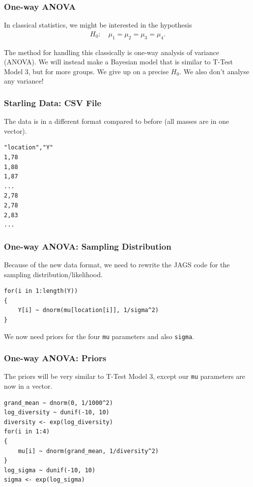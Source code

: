 \documentclass{beamer}
\begin{document}
\begin{frame}[fragile]
\frametitle{One-way ANOVA}
In classical statistics, we might be interested in the hypothesis
\begin{align}
H_0:\quad \mu_1 = \mu_2 = \mu_3 = \mu_4.
\end{align}
\pause

The method for handling this classically is one-way analysis of variance
(ANOVA). We will instead make a Bayesian model that is similar to T-Test
Model 3, but for more groups. We give up on a precise $H_0$.
We also don't analyse any variance!

\end{frame}



\begin{frame}[fragile]
\frametitle{Starling Data: CSV File}
The data is in a different format compared to before (all masses are in one
vector).
\begin{verbatim}
"location","Y"
1,78
1,88
1,87
...
2,78
2,78
2,83
...
\end{verbatim}

\end{frame}


\begin{frame}[fragile]
\frametitle{One-way ANOVA: Sampling Distribution}
Because of the new data format, we need to rewrite the JAGS
code for the sampling distribution/likelihood.

\begin{verbatim}
for(i in 1:length(Y))
{
    Y[i] ~ dnorm(mu[location[i]], 1/sigma^2)
}
\end{verbatim}
\pause
We now need priors for the four \texttt{mu} parameters
and also \texttt{sigma}.

\end{frame}


\begin{frame}[fragile]
\frametitle{One-way ANOVA: Priors}
The priors will be very similar to T-Test Model 3, except our
\texttt{mu} parameters are now in a vector.
\footnotesize
\begin{verbatim}
grand_mean ~ dnorm(0, 1/1000^2)
log_diversity ~ dunif(-10, 10)
diversity <- exp(log_diversity)
for(i in 1:4)
{
    mu[i] ~ dnorm(grand_mean, 1/diversity^2)
}
log_sigma ~ dunif(-10, 10)
sigma <- exp(log_sigma)
\end{verbatim}

\end{frame}
\end{document}
